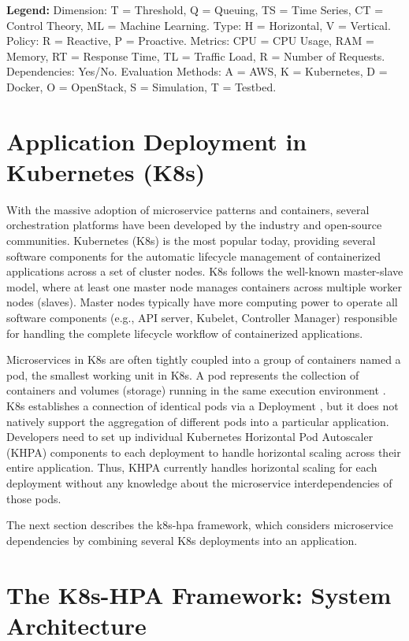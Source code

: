 \documentclass[conference]{IEEEtran}
\begin{document}
\begin{table}[h]
\textbf{Legend:} Dimension: T = Threshold, Q = Queuing, TS = Time Series, CT = Control Theory, ML = Machine Learning. Type: H = Horizontal, V = Vertical. Policy: R = Reactive, P = Proactive. Metrics: CPU = CPU Usage, RAM = Memory, RT = Response Time, TL = Traffic Load, R = Number of Requests. Dependencies: Yes/No. Evaluation Methods: A = AWS, K = Kubernetes, D = Docker, O = OpenStack, S = Simulation, T = Testbed.
\end{table}

\section{Application Deployment in Kubernetes (K8s)}
\label{sec:application_deployment_k8s}

With the massive adoption of microservice patterns and containers, several orchestration platforms have been developed by the industry and open-source communities. Kubernetes (K8s) is the most popular today, providing several software components for the automatic lifecycle management of containerized applications across a set of cluster nodes. K8s follows the well-known master-slave model, where at least one master node manages containers across multiple worker nodes (slaves). Master nodes typically have more computing power to operate all software components (e.g., API server, Kubelet, Controller Manager) responsible for handling the complete lifecycle workflow of containerized applications.

Microservices in K8s are often tightly coupled into a group of containers named a pod, the smallest working unit in K8s. A pod represents the collection of containers and volumes (storage) running in the same execution environment \cite{burns2019kubernetes}. K8s establishes a connection of identical pods via a Deployment \cite{kubernetesDeployment}, but it does not natively support the aggregation of different pods into a particular application. Developers need to set up individual Kubernetes Horizontal Pod Autoscaler (KHPA) components to each deployment to handle horizontal scaling across their entire application. Thus, KHPA currently handles horizontal scaling for each deployment without any knowledge about the microservice interdependencies of those pods. 

The next section describes the k8s-hpa framework, which considers microservice dependencies by combining several K8s deployments into an application.

\section{The K8s-HPA Framework: System Architecture}
\label{sec:k8s-hpa-framework}
\end{document}
